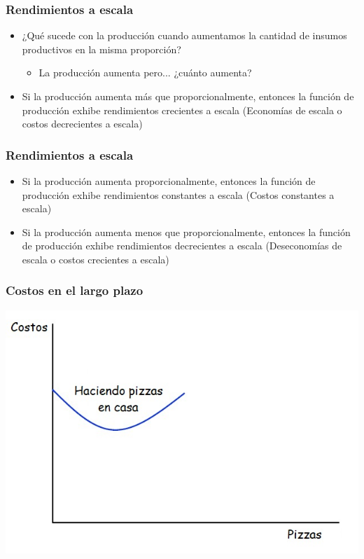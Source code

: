 \documentclass{beamer}
\begin{document}
\begin{frame}
\frametitle{Rendimientos a escala}
\begin{itemize}
    \item ¿Qué sucede con la producción cuando aumentamos la cantidad de insumos productivos en la misma proporción?\vspace{2mm}
    \begin{itemize}
        \item La producción aumenta pero... ¿cuánto aumenta?\vspace{4mm}
    \end{itemize}
    \item Si la producción aumenta más que proporcionalmente, entonces la función de producción exhibe rendimientos crecientes a escala (Economías de escala o costos decrecientes a escala)
\end{itemize}
\end{frame}

\begin{frame}
\frametitle{Rendimientos a escala}
\begin{itemize}
    \item Si la producción aumenta proporcionalmente, entonces la función de producción exhibe rendimientos constantes a escala (Costos constantes a escala)\vspace{4mm}
    \item Si la producción aumenta menos que proporcionalmente, entonces la función de producción exhibe rendimientos decrecientes a escala (Deseconomías de escala o costos crecientes a escala)
\end{itemize}
\end{frame}

\begin{frame}
\frametitle{Costos en el largo plazo}
\centering
\includegraphics[scale=0.6]{../Figures/Tema_06.24.jpg}
\end{frame}
\end{document}
